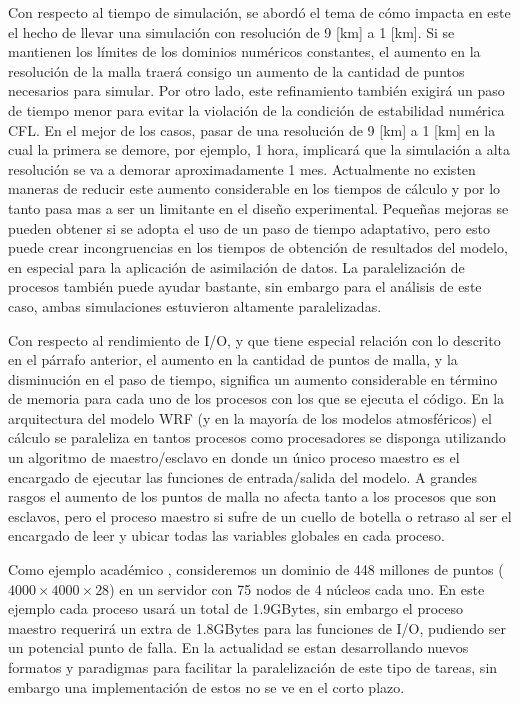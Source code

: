 Con respecto al tiempo de simulación, se abordó el tema de cómo impacta en este el hecho de llevar una simulación con resolución de 9 [km] a 1 [km]. Si se mantienen los límites de los dominios numéricos constantes, el aumento en la resolución de la malla traerá consigo un aumento de la cantidad de puntos necesarios para simular. Por otro lado, este refinamiento también exigirá un paso de tiempo menor para evitar la violación de la condición de estabilidad numérica CFL. En el mejor de los casos, pasar de una resolución de 9 [km] a 1 [km] en la cual la primera se demore, por ejemplo, 1 hora, implicará que la simulación a alta resolución se va a demorar aproximadamente 1 mes. Actualmente no existen maneras de reducir este aumento considerable en los tiempos de cálculo y por lo tanto pasa mas a ser un limitante en el diseño experimental. Pequeñas mejoras se pueden obtener si se adopta el uso de un paso de tiempo adaptativo, pero esto puede crear incongruencias en los tiempos de obtención de resultados del modelo, en especial para la aplicación de asimilación de datos. La paralelización de procesos también puede ayudar bastante, sin embargo para el análisis de este caso, ambas simulaciones estuvieron altamente paralelizadas.

Con respecto al rendimiento de I/O, y que tiene especial relación con lo descrito en el párrafo anterior, el aumento en la cantidad de puntos de malla, y la disminución en el paso de tiempo, significa un aumento considerable en término de memoria para cada uno de los procesos con los que se ejecuta el código. En la arquitectura del modelo WRF (y en la mayoría de los modelos atmosféricos) el cálculo se paraleliza en tantos procesos como procesadores se disponga utilizando un algoritmo de maestro/esclavo en donde un único proceso maestro es el encargado de ejecutar las funciones de entrada/salida del modelo. A grandes rasgos el aumento de los puntos de malla no afecta tanto a los procesos que son esclavos, pero el proceso maestro si sufre de un cuello de botella o retraso al ser el encargado de leer y ubicar todas las variables globales en cada proceso. 

Como ejemplo académico \citep{arnold2012high}, consideremos un dominio de 448 millones de puntos ($4000\times4000\times28$) en un servidor con 75 nodos de 4 núcleos cada uno. En este ejemplo cada proceso usará un total de 1.9GBytes, sin embargo el proceso maestro requerirá un extra de 1.8GBytes para las funciones de I/O, pudiendo ser un potencial punto de falla. En la actualidad se estan desarrollando nuevos formatos y paradigmas para facilitar la paralelización de este tipo de tareas, sin embargo una implementación de estos no se ve en el corto plazo.

